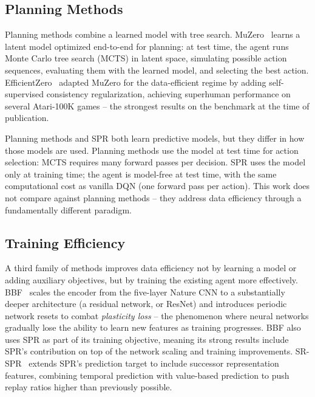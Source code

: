 \subsection{Planning Methods}
\label{subsec:planning-methods}

Planning methods combine a learned model with tree search.
MuZero~\citep{schrittwieser2020mastering} learns a latent model
optimized end-to-end for planning: at test time, the agent runs
Monte Carlo tree search (MCTS) in latent space, simulating possible
action sequences, evaluating them with the learned model, and
selecting the best action.
EfficientZero~\citep{ye2021mastering} adapted MuZero for the
data-efficient regime by adding self-supervised consistency
regularization, achieving superhuman performance on several
Atari-100K games -- the strongest results on the benchmark at the
time of publication.

\smallskip
Planning methods and SPR both learn predictive models, but they
differ in how those models are used. Planning methods use the
model at test time for action selection: MCTS requires many forward
passes per decision. SPR uses the model only at training time; the
agent is model-free at test time, with the same computational cost
as vanilla DQN (one forward pass per action). This work does not
compare against planning methods -- they address data efficiency
through a fundamentally different paradigm.

\subsection{Training Efficiency}
\label{subsec:training-efficiency}

A third family of methods improves data efficiency not by learning
a model or adding auxiliary objectives, but by training the
existing agent more effectively.
BBF~\citep{schwarzer2023bigger} scales the encoder from the
five-layer Nature CNN to a substantially deeper architecture
(a residual network, or ResNet) and introduces periodic network
resets to combat \emph{plasticity loss} -- the phenomenon where
neural networks gradually lose the ability to learn new features as
training progresses. BBF also uses SPR as part of its training
objective, meaning its strong results include SPR's contribution on
top of the network scaling and training improvements.
SR-SPR~\citep{doro2023sampleefficient} extends SPR's prediction
target to include successor representation features, combining
temporal prediction with value-based prediction to push replay
ratios higher than previously possible.

